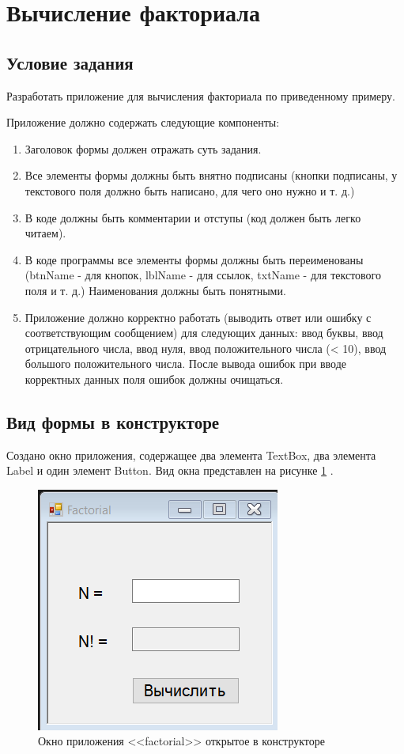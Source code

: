 \section{Вычисление факториала}

\subsection{Условие задания}

Разработать приложение для вычисления факториала по приведенному примеру. 

Приложение должно содержать следующие компоненты:
\begin{enumerate}
    \item Заголовок формы должен отражать суть задания.
    \item Все элементы формы должны быть внятно подписаны (кнопки подписаны, у текстового поля должно быть написано, для чего оно нужно и т. д.)
    \item В коде должны быть комментарии и отступы (код должен быть легко читаем).
    \item В коде программы все элементы формы должны быть переименованы (btnName -  для кнопок, lblName - для ссылок, txtName - для текстового поля и т. д.) Наименования должны быть понятными.
    \item Приложение должно корректно работать (выводить ответ или ошибку с соответствующим сообщением) для следующих данных: ввод буквы, ввод отрицательного числа, ввод нуля, ввод положительного числа (< 10), ввод большого положительного числа. После вывода ошибок при вводе корректных данных поля ошибок должны очищаться.  
\end{enumerate}


\subsection{Вид формы в конструкторе}

Создано окно приложения, содержащее два элемента TextBox, два элемента
Label и один элемент Button. Вид окна представлен на рисунке \ref{task1_form} \cite{лаврентьев2020использование}. 

\begin{figure}[H]
    \centering
    \includegraphics[width=0.3\linewidth]{lections/img/task1_form.png}
    \caption{Окно приложения <<factorial>> открытое в конструкторе }
    \label{task1_form}
\end{figure}


